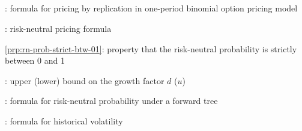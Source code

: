\subsection*{}
\item {}: formula for pricing by replication in one-period binomial option pricing model
\item {}: risk-neutral pricing formula
\item \cref{prp:rn-prob-strict-btw-01}: property that the risk-neutral probability is strictly between 0 and 1
\item {}: upper (lower) bound on the growth factor \(d\) (\(u\))
\item {}: formula for risk-neutral probability under a forward tree
\item {}: formula for historical volatility
